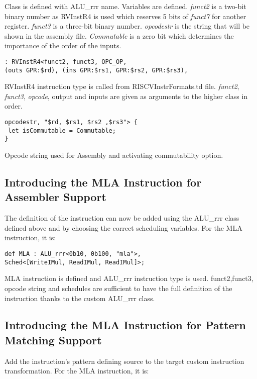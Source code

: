 Class is defined with ALU\_rrr name. Variables are defined. \textit{funct2} is a two-bit binary number as RVInstR4 is used which reserves 5 bits of \textit{funct7} for another register. \textit{funct3} is a three-bit binary number. \textit{opcodestr} is the string that will be shown in the assembly file. \textit{Commutable} is a zero bit which determines the importance of the order of the inputs.

\begin{lstlisting}
: RVInstR4<funct2, funct3, OPC_OP,
(outs GPR:$rd), (ins GPR:$rs1, GPR:$rs2, GPR:$rs3),
\end{lstlisting}

RVInstR4 instruction type is called from RISCVInstrFormats.td file. \textit{funct2}, \textit{funct3}, \textit{opcode}, output and inputs are given as arguments to the higher class in order.

\begin{lstlisting}
opcodestr, "$rd, $rs1, $rs2 ,$rs3"> {
 let isCommutable = Commutable;
}
\end{lstlisting}

Opcode string used for Assembly and activating commutability option.

\subsection{Introducing the MLA Instruction for Assembler Support}

The definition of the instruction can now be added using the ALU\_rrr class defined above and by choosing the correct scheduling variables. For the MLA instruction, it is:

\begin{lstlisting}
def MLA : ALU_rrr<0b10, 0b100, "mla">,
Sched<[WriteIMul, ReadIMul, ReadIMul]>;
\end{lstlisting}

MLA instruction is defined and ALU\_rrr instruction type is used. funct2,funct3, opcode string and schedules are sufficient to have the full definition of the instruction thanks to the custom ALU\_rrr class.

\subsection{Introducing the MLA Instruction for Pattern Matching Support}
Add the instruction’s pattern defining source to the target custom instruction transformation. For the MLA instruction, it is:

